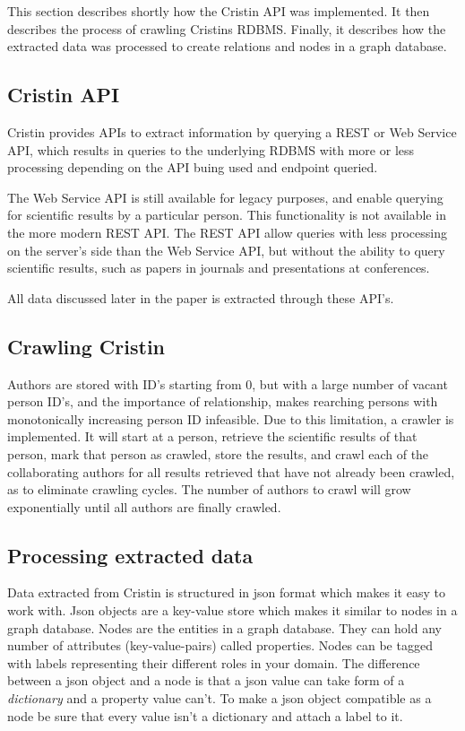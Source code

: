 This section describes shortly how the Cristin API was implemented. It then describes the process of crawling Cristins RDBMS. Finally, it describes how the extracted data was processed to create relations and nodes in a graph database.

\subsection*{Cristin API}
Cristin provides APIs to extract information by querying a REST or Web Service API, which results in queries to the underlying RDBMS with more or less processing depending on the API buing used and endpoint queried\cite{CRISTIN-API-summary}.

The Web Service API\cite{CRISTIN-WS} is still available for legacy purposes, and enable querying for scientific results by a particular person. This functionality is not available in the more modern REST API. The REST API\cite{CRISTIN-REST} allow queries with less processing on the server's side than the Web Service API, but without the ability to query scientific results, such as papers in journals and presentations at conferences.

All data discussed later in the paper is extracted through these API's.

\subsection*{Crawling Cristin}
Authors are stored with ID's starting from 0, but with a large number of vacant person ID's, and the importance of relationship, makes rearching persons with monotonically increasing person ID infeasible.
Due to this limitation, a crawler is implemented. It will start at a person, retrieve the scientific results of that person, mark that person as crawled, store the results, and crawl each of the collaborating authors for all results retrieved that have not already been crawled, as to eliminate crawling cycles.
The number of authors to crawl will grow exponentially until all authors are finally crawled.

\subsection*{Processing extracted data}
Data extracted from Cristin is structured in json format which makes it easy to work with. Json objects are a key-value store which makes it similar to nodes in a graph database. Nodes are the entities in a graph database. They can hold any number of attributes (key-value-pairs) called properties. Nodes can be tagged with labels representing their different roles in your domain.\cite{neo4j} The difference between a json object and a node is that a json value can take form of a \textit{dictionary} and a property value can't. To make a json object compatible as a node be sure that every value isn't a dictionary and attach a label to it.





